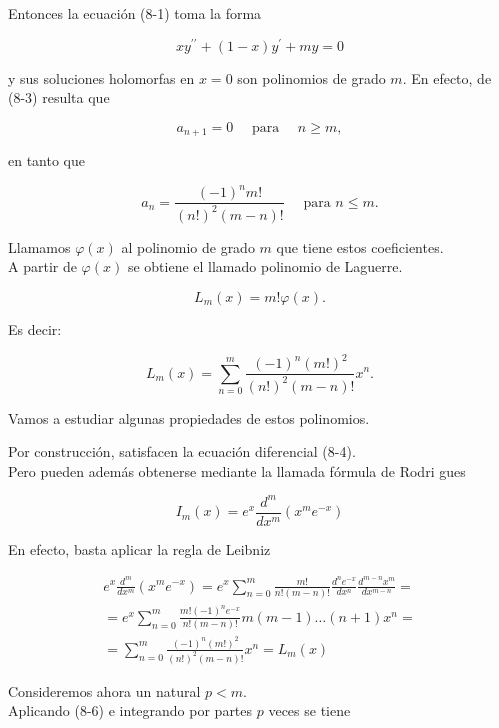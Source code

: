 \documentclass[10pt]{article}
\theoremstyle{plain}
\theoremstyle{definition}
\theoremstyle{remark}
\begin{document}
Entonces la ecuación (8-1) toma la forma


\begin{equation*}
x y^{\prime \prime}+(1-x) y^{\prime}+m y=0 \tag{8-4}
\end{equation*}


y sus soluciones holomorfas en $x=0$ son polinomios de grado $m$. En efecto, de (8-3) resulta que

$$
a_{n+1}=0 \quad \text { para } \quad n \geqslant m,
$$

en tanto que

$$
a_{n}=\frac{(-1)^{n} m!}{(n!)^{2}(m-n)!} \quad \text { para } n \leqslant m .
$$

Llamamos $\varphi(x)$ al polinomio de grado $m$ que tiene estos coeficientes.\\
A partir de $\varphi(x)$ se obtiene el llamado polinomio de Laguerre.

$$
L_{m}(x)=m!\varphi(x) .
$$

Es decir:


\begin{equation*}
L_{m}(x)=\sum_{n=0}^{m} \frac{(-1)^{n}(m!)^{2}}{(n!)^{2}(m-n)!} x^{n} . \tag{8-5}
\end{equation*}


Vamos a estudiar algunas propiedades de estos polinomios.

Por construcción, satisfacen la ecuación diferencial (8-4).\\
Pero pueden además obtenerse mediante la llamada fórmula de Rodri gues


\begin{equation*}
I_{m}(x)=e^{x} \frac{d^{m}}{d x^{m}}\left(x^{m} e^{-x}\right) \tag{8-6}
\end{equation*}


En efecto, basta aplicar la regla de Leibniz

$$
\begin{gathered}
e^{x} \frac{d^{m}}{d x^{m}}\left(x^{m} e^{-x}\right)=e^{x} \sum_{n=0}^{m} \frac{m!}{n!(m-n)!} \frac{d^{n} e^{-x}}{d x^{n}} \frac{d^{m-n} x^{m}}{d x^{m-n}}= \\
=e^{x} \sum_{n=0}^{m} \frac{m!(-1)^{n} e^{-x}}{n!(m-n)!} m(m-1) \ldots(n+1) x^{n}= \\
=\sum_{n=0}^{m} \frac{(-1)^{n}(m!)^{2}}{(n!)^{2}(m-n)!} x^{n}=L_{m}(x)
\end{gathered}
$$

Consideremos ahora un natural $p<m$.\\
Aplicando (8-6) e integrando por partes $p$ veces se tiene
\end{document}
